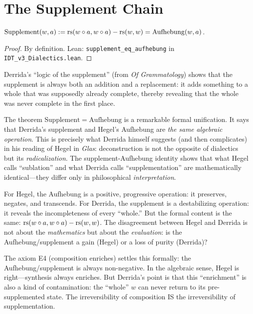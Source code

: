\section{The Supplement Chain}

\begin{theorem}
\label{thm:supplement-aufhebung-formal}
$\mathrm{Supplement}(w, a) := \mathrm{rs}(w \circ a, w \circ a) - \mathrm{rs}(w, w)
= \mathrm{Aufhebung}(w, a)$.
\end{theorem}

\begin{proof}
By definition.
Lean: \texttt{supplement\_eq\_aufhebung} in
\texttt{IDT\_v3\_Dialectics.lean}.
\end{proof}

\begin{interpretation}
Derrida's ``logic of the supplement'' (from \textit{Of Grammatology}) shows
that the supplement is always both an addition and a replacement: it adds
something to a whole that was supposedly already complete, thereby revealing
that the whole was never complete in the first place.

The theorem $\mathrm{Supplement} = \mathrm{Aufhebung}$ is a remarkable formal
unification. It says that Derrida's supplement and Hegel's Aufhebung are
\emph{the same algebraic operation}. This is precisely what Derrida himself
suggests (and then complicates) in his reading of Hegel in \textit{Glas}:
deconstruction is not the opposite of dialectics but its \emph{radicalization}.
The supplement-Aufhebung identity shows that what Hegel calls ``sublation''
and what Derrida calls ``supplementation'' are mathematically identical---they
differ only in philosophical \emph{interpretation}.

For Hegel, the Aufhebung is a positive, progressive operation: it preserves,
negates, and transcends. For Derrida, the supplement is a destabilizing
operation: it reveals the incompleteness of every ``whole.'' But the formal
content is the same: $\mathrm{rs}(w \circ a, w \circ a) - \mathrm{rs}(w, w)$. The
disagreement between Hegel and Derrida is not about the \emph{mathematics}
but about the \emph{evaluation}: is the Aufhebung/supplement a gain (Hegel)
or a loss of purity (Derrida)?

The axiom E4 (composition enriches) settles this formally: the
Aufhebung/supplement is always non-negative. In the algebraic sense, Hegel
is right---synthesis always enriches. But Derrida's point is that this
``enrichment'' is also a kind of contamination: the ``whole'' $w$ can never
return to its pre-supplemented state. The irreversibility of composition
IS the irreversibility of supplementation.
\end{interpretation}

